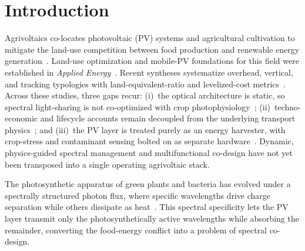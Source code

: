 \documentclass[preprint,12pt]{elsarticle}
\begin{document}


\section{Introduction}

Agrivoltaics co-locates photovoltaic (PV) systems and agricultural cultivation to mitigate the land-use competition between food production and renewable energy generation~\cite{Dupraz2011}. Land-use optimization and mobile-PV foundations for this field were established in \textit{Applied Energy}~\cite{Valle2017,Amaducci2018}. Recent syntheses systematize overhead, vertical, and tracking typologies with land-equivalent-ratio and levelized-cost metrics~\cite{Mahim2025}.
Across these studies, three gaps recur: (i)~the optical architecture is static, so spectral light-sharing is not co-optimized with crop photophysiology~\cite{Thompson2020,Zhao2023}; (ii)~techno-economic and lifecycle accounts remain decoupled from the underlying transport physics~\cite{Ravilla2024,Bellone2024}; and (iii)~the PV layer is treated purely as an energy harvester, with crop-stress and contaminant sensing bolted on as separate hardware~\cite{CiallaMay2024,Pook2025,KaurJeet2026}. Dynamic, physics-guided spectral management and multifunctional co-design have not yet been transposed into a single operating agrivoltaic stack.

The photosynthetic apparatus of green plants and bacteria has evolved under a spectrally structured photon flux, where specific wavelengths drive charge separation while others dissipate as heat~\cite{Blankenship2011}.
This spectral specificity lets the PV layer transmit only the photosynthetically active wavelengths while absorbing the remainder, converting the food-energy conflict into a problem of spectral co-design.
\end{document}
